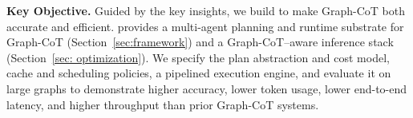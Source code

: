 \textbf{Key Objective.}
Guided by the key insights, we build \projectname to make Graph-CoT both accurate and efficient. \projectname provides a multi-agent planning and runtime substrate for Graph-CoT (Section~\ref{sec:framework}) and a Graph-CoT–aware inference stack (Section~\ref{sec: optimization}). We specify the plan abstraction and cost model, cache and scheduling policies, 
a pipelined execution engine, and evaluate it on large graphs to demonstrate higher accuracy, lower token usage, lower end-to-end latency, and higher throughput than prior Graph-CoT systems.










